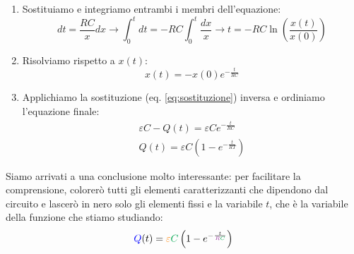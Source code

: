 \documentclass[a3paper, twoside, openany]{book}
\theoremstyle{definition}
\begin{document}
\begin{enumerate}
\item Sostituiamo e integriamo entrambi i membri dell'equazione: \begin{equation}dt=\frac{RC}{x}dx\longrightarrow \int_0^tdt=-RC\int_0^t\frac{dx}{x}\longrightarrow t=-RC\ln{\left(\frac{x(t)}{x(0)}\right)}\end{equation}
\item Risolviamo rispetto a $x(t)$: \begin{equation}x(t)=-x(0)e^{-\frac{t}{RC}}\end{equation}
\item Applichiamo la sostituzione (eq. \ref{eq:sostituzione}) inversa e ordiniamo l'equazione finale: \begin{equation}\begin{split}\varepsilon C-Q(t)=\varepsilon Ce^{-\frac{t}{RC}} \\ Q(t)=\varepsilon C \left(1-e^{-\frac{t}{RT}}\right)\end{split}\end{equation}
\end{enumerate} Siamo arrivati a una conclusione molto interessante: per facilitare la comprensione, colorerò tutti gli elementi caratterizzanti che dipendono dal circuito e lascerò in nero solo gli elementi fissi e la variabile $t$, che è la variabile della funzione che stiamo studiando: $$\textcolor{blue}{Q}(t)=\textcolor{orange}{\varepsilon}\textcolor{Green}{C}\left(1-e^{-\frac{t}{\textcolor{Purple}{R}\textcolor{Green}{C}}}\right)$$
\end{document}
